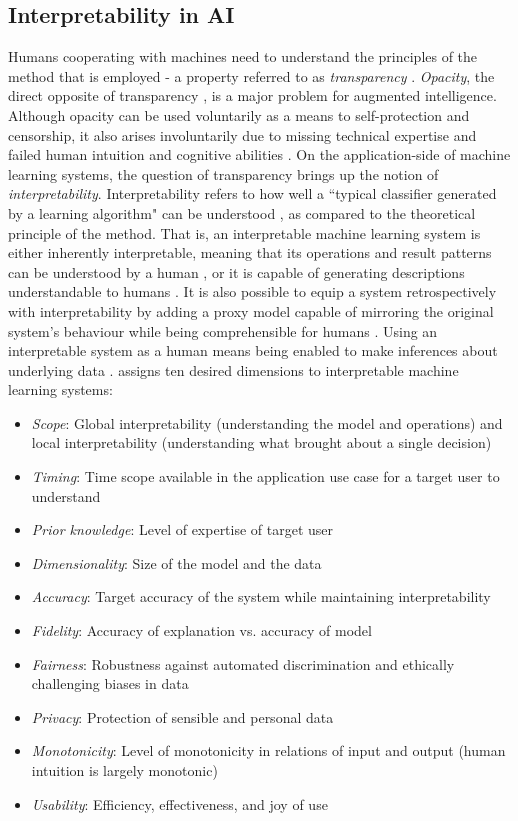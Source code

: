 \subsection{Interpretability in AI}
Humans cooperating with machines need to understand the principles of the method that is employed - a property referred to as \textit{transparency} \cite{kotsiantis2007supervised}. \textit{Opacity}, the direct opposite of transparency \cite{lipton2016mythos}, is a major problem for augmented intelligence. Although opacity can be used voluntarily as a means to self-protection and censorship, it also arises involuntarily due to missing technical expertise and failed human intuition and cognitive abilities \cite{burrell2016machine}.\newline
On the application-side of machine learning systems, the question of transparency brings up the notion of \textit{interpretability}. Interpretability refers to how well a ``typical classifier generated by a learning algorithm" can be understood \cite{kotsiantis2007supervised}, as compared to the theoretical principle of the method. That is, an interpretable machine learning system is either inherently interpretable, meaning that its operations and result patterns can be understood by a human \cite{biran2017explanation} \cite{ventocilla2018taxonomy}, or it is capable of generating descriptions understandable to humans \cite{gilpin2018explaining}. It is also possible to equip a system retrospectively with interpretability by adding a proxy model capable of mirroring the original system's behaviour while being comprehensible for humans \cite{guidotti2018survey}. Using an interpretable system as a human means being enabled to make inferences about underlying data \cite{ventocilla2018taxonomy}.\newline
\cite{guidotti2018survey} assigns ten desired dimensions to interpretable machine learning systems:
\begin{itemize}
	\item \textit{Scope}: Global interpretability (understanding the model and operations) and local interpretability (understanding what brought about a single decision)
	\item \textit{Timing}: Time scope available in the application use case for a target user to understand 
	\item \textit{Prior knowledge}: Level of expertise of target user
	\item \textit{Dimensionality}: Size of the model and the data
	\item \textit{Accuracy}: Target accuracy of the system while maintaining interpretability
	\item \textit{Fidelity}: Accuracy of explanation vs. accuracy of model
	\item \textit{Fairness}: Robustness against automated discrimination and ethically challenging biases in data
	\item \textit{Privacy}: Protection of sensible and personal data
	\item \textit{Monotonicity}: Level of monotonicity in relations of input and output (human intuition is largely monotonic)
	\item \textit{Usability}: Efficiency, effectiveness, and joy of use
\end{itemize}
